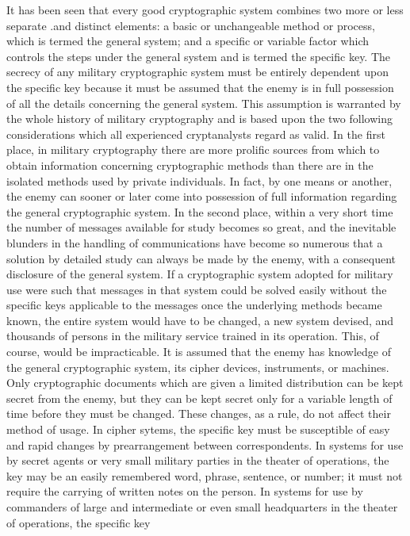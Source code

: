 It has been seen that every good cryptographic system combines two
more or less separate .and distinct elements: a basic or unchangeable
method or process, which is termed the general system; and a speciﬁc or
variable factor which controls the steps under the general system and is
termed the speciﬁc key. The secrecy of any military cryptographic system
must be entirely dependent upon the speciﬁc key because it must be
assumed that the enemy is in full possession of all the details concerning
the general system. This assumption is warranted by the whole history
of military cryptography and is based upon the two following considerations which all experienced cryptanalysts regard as valid. In the ﬁrst
place, in military cryptography there are more proliﬁc sources from which
to obtain information concerning cryptographic methods than there are
in the isolated methods used by private individuals. In fact, by one
means or another, the enemy can sooner or later come into possession of
full information regarding the general cryptographic system. In the
second place, within a very short time the number of messages available
for study becomes so great, and the inevitable blunders in the handling
of communications have become so numerous that a solution by detailed
study can always be made by the enemy, with a consequent disclosure of
the general system. If a cryptographic system adopted for military use
were such that messages in that system could be solved easily without
the speciﬁc keys applicable to the messages once the underlying methods
became known, the entire system would have to be changed, a new system
devised, and thousands of persons in the military service trained in its
operation. This, of course, would be impracticable. It is assumed that
the enemy has knowledge of the general cryptographic system, its cipher
devices, instruments, or machines. Only cryptographic documents which
are given a limited distribution can be kept secret from the enemy, but
they can be kept secret only for a variable length of time before they
must be changed. These changes, as a rule, do not affect their method of
usage. In cipher sytems, the speciﬁc key must be susceptible of easy
and rapid changes by prearrangement between correspondents. In
systems for use by secret agents or very small military parties in the
theater of operations, the key may be an easily remembered word, phrase,
sentence, or number; it must not require the carrying of written notes on
the person. In systems for use by commanders of large and intermediate
or even small headquarters in the theater of operations, the speciﬁc key
